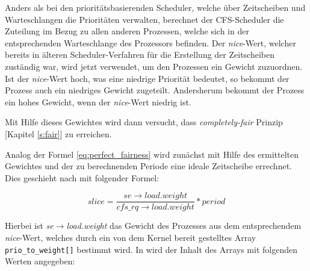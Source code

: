 Anders als bei den prioritätsbasierenden Scheduler, welche über Zeitscheiben und Warte\-schlan\-gen die Prioritäten verwalten, berechnet der CFS-Scheduler die Zuteilung im Bezug zu allen anderen Prozessen, welche sich in der entsprechenden Warteschlange des Prozessors befinden. Der  \textit{nice}-Wert, welcher bereits in älteren Scheduler-\-Ver\-fahren für die Erstellung der Zeitscheiben zuständig war, wird jetzt verwendet, um den Prozessen ein Gewicht zuzuordnen. Ist der \textit{nice}-Wert hoch, was eine niedrige Priorität bedeutet, so bekommt der Prozess auch ein niedriges Gewicht zugeteilt. Andersherum bekommt der Prozess ein hohes Gewicht, wenn der  \textit{nice}-Wert niedrig ist.

Mit Hilfe dieses Gewichtes wird dann versucht, dass \textit{com\-pletely-fair} Prinzip [Kapitel \ref{s:fair}] zu erreichen. 

Analog der Formel \ref{eq:perfect_fairness} wird zunächst mit Hilfe des ermittelten Gewichtes und der zu berechnenden Periode eine ideale Zeitscheibe errechnet. Dies geschieht nach \cite{paperfairness} mit folgender Formel:  

\begin{equation}
slice = \frac{se\rightarrow load.weight}{cfs\_rq\rightarrow load.weight} * period
\label{eq:slice}
\end{equation}

Hierbei ist \textit{se$\rightarrow$load.weight} das Gewicht des Prozesses aus dem entsprechendem \textit{nice}-Wert, welches durch ein von dem Kernel bereit gestelltes Array \texttt{prio\_to\_weight[]} bestimmt wird. In \cite{nikita} wird der Inhalt des Arrays mit folgenden Werten angegeben:

